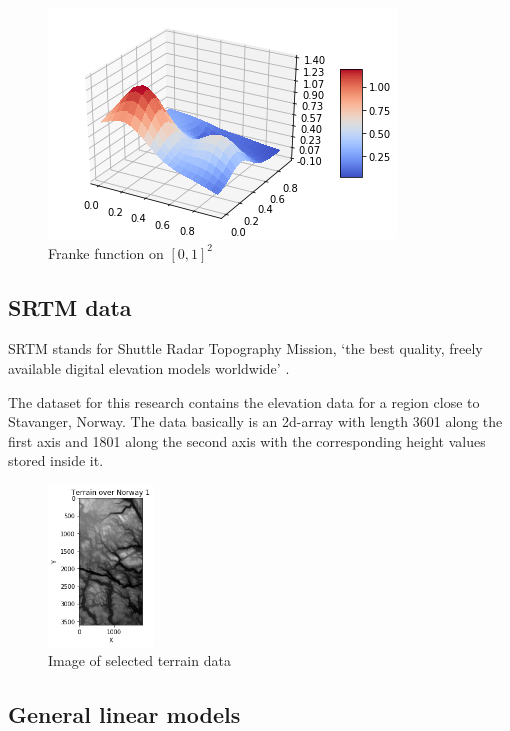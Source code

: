 \documentclass[12pt]{extarticle}
\begin{document}
\begin{figure}
    \centering
    \includegraphics{franke_function}
    \caption{Franke function on $[0, 1]^2$}
    \label{fig:f1}
\end{figure}

\subsection{SRTM data}

SRTM stands for Shuttle Radar Topography Mission, ‘the best quality, freely available digital elevation models worldwide’ \cite{nik}. 

The dataset for this research contains the elevation data for a region close to Stavanger, Norway. The data basically is an 2d-array with length 3601 along the first axis and 1801 along the second axis with the corresponding height values stored inside it.

\begin{figure}
    \centering
    \includegraphics[width=0.25\textwidth]{terr_over_norway}
    \caption{Image of selected terrain data}
    \label{fig:f2}
\end{figure}

\subsection{General linear models}
\end{document}
